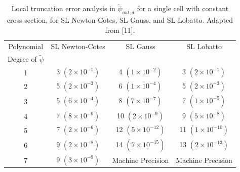 %
%
\begin{table}[!htp]
\centering
\caption{Local truncation error analysis in $\widetilde{\psi}_{out,d}$ for a single cell with constant cross section, for SL Newton-Cotes, SL Gauss, and SL Lobatto.   Adapted from [11].}
\begin{tabular}{|c|c|c|c|} 
\hline
  Polynomial 										 & SL Newton-Cotes 					& SL Gauss 			 					& SL Lobatto  \\
  Degree  of $\widetilde{\psi}$	& {}		 							 			& {}   										&	 {}   \\
  	\hline
				1   										&	3 $(2\times 10^{-1})$		&	4 $(1\times 10^{-2})$			&	3 $(2\times 10^{-1})$	\\
		\hline
				2   										&	5 $(2\times 10^{-3})$			&	6 $(1\times 10^{-4})$		&	5 $(2\times 10^{-3})$		\\
		\hline	
				3   										&	5 $(6\times 10^{-4})$		&	8 $(7\times 10^{-7})$			&	7 $(1\times 10^{-5})$	\\
		\hline
				4   										&	7 $(8\times 10^{-6})$		&	10 $(2\times 10^{-9})$		&	9 $(5\times 10^{-8})$	\\
		\hline
				5   										&	7 $(2\times 10^{-6})$		&	12 $(5\times 10^{-12})$		&	11 $(1\times 10^{-10})$	\\
		\hline		
				6   										&	9 $(2\times 10^{-8})$		&	14 $(7\times 10^{-15})$		&	13 $(2\times 10^{-13})$\\
		\hline
				7   										&	9 $(3\times 10^{-9})$		& Machine Precision					&	Machine Precision  \\
		\hline
\end{tabular}
\label{tbl:taylor_out_part2} 
\end{table}

